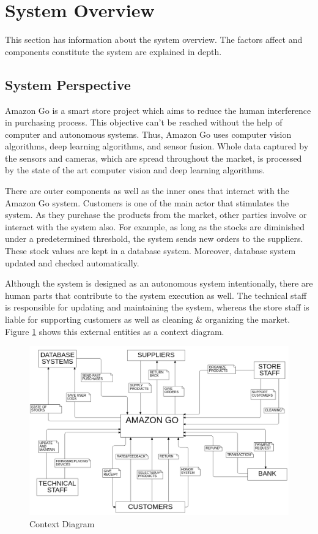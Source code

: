 \section{System Overview}

This section has information about the system overview. The factors affect and
components constitute the system are explained in depth.

\subsection{System Perspective}

Amazon Go is a smart store project which aims to reduce the human interference in purchasing process. This objective can't be reached without the help of computer and autonomous systems. Thus, Amazon Go uses computer vision algorithms, deep learning algorithms, and sensor fusion. Whole data captured by the sensors and cameras, which are spread throughout the market, is processed by the state of the art computer vision and deep learning algorithms.

There are outer components as well as the inner ones that interact with the Amazon Go system. Customers is one of the main actor that stimulates the system. As they purchase the products from the market, other parties involve or interact with the system also. For example, as long as the stocks are diminished under a predetermined threshold, the system sends new orders to the suppliers. These stock values are kept in a database system. Moreover, database system updated and checked automatically.

Although the system is designed as an autonomous system intentionally, there are human parts that contribute to the system execution as well. The technical staff is responsible for updating and maintaining the system, whereas the store staff is liable for supporting customers as well as cleaning \& organizing the market. Figure \ref{fig:context_diagram} shows this external entities as a context diagram.

\begin{figure} [H]
    \centering
    \includegraphics[width=\linewidth]{content/introduction/img/contextDiagram.png}
    \caption{Context Diagram}
    \label{fig:context_diagram}
\end{figure}

